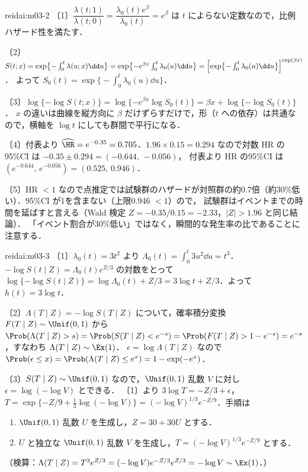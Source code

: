 \begin{kaitou}{reidai:m03-2}
〔1〕$\dfrac{\lambda(t;1)}{\lambda(t;0)}=\dfrac{\lambda_0(t)e^\beta}{\lambda_0(t)}=e^\beta$ は $t$ によらない定数なので，比例ハザード性を満たす．

〔2〕$S(t;x)=\exp\bigl\{-\int_0^t\lambda(u;x)\dd u\bigr\}=\exp\bigl\{-e^{\beta x}\int_0^t\lambda_0(u)\dd u\bigr\}=\Bigl[\exp\bigl\{-\int_0^t\lambda_0(u)\dd u\bigr\}\Bigr]^{\exp(\beta x)}$．
よって $S_0(t)=\exp\bigl\{-\int_0^t\lambda_0(u)\dd u\bigr\}$．

〔3〕$\log\{-\log S(t;x)\}=\log\{-e^{\beta x}\log S_0(t)\}=\beta x+\log\{-\log S_0(t)\}$．
$x$ の違いは曲線を縦方向に $\beta$ だけずらすだけで，形（$t$ への依存）は共通なので，横軸を $\log t$ にしても群間で平行になる．

〔4〕付表より $\widehat{\HR}=e^{-0.35}=0.705$．$1.96\times0.15=0.294$ なので対数 HR の95\%CI は $-0.35\pm0.294=(-0.644,\,-0.056)$，
付表より HR の95\%CI は $(e^{-0.644},\,e^{-0.056})=(0.525,\,0.946)$．

〔5〕HR $<1$ なので点推定では試験群のハザードが対照群の約0.7倍（約30\%低い）．95\%CI が1を含まない（上限0.946 $<1$）ので，
試験群はイベントまでの時間を延ばすと言える（Wald 検定 $Z=-0.35/0.15=-2.33$，$|Z|>1.96$ と同じ結論）．
「イベント割合が30\%低い」ではなく，瞬間的な発生率の比であることに注意する．
\end{kaitou}

\begin{kaitou}{reidai:m03-3}
〔1〕$\lambda_0(t)=3t^2$ より $\Lambda_0(t)=\int_0^t3u^2\dd u=t^3$．$-\log S(t\mid Z)=\Lambda_0(t)e^{Z/3}$ の対数をとって
$\log\{-\log S(t\mid Z)\}=\log\Lambda_0(t)+Z/3=3\log t+Z/3$．よって $h(t)=3\log t$．

〔2〕$\Lambda(T\mid Z)=-\log S(T\mid Z)$ について，確率積分変換 $F(T\mid Z)\sim\Unif(0,1)$ から
$\Prob(\Lambda(T\mid Z)>s)=\Prob(S(T\mid Z)<e^{-s})=\Prob(F(T\mid Z)>1-e^{-s})=e^{-s}$，すなわち $\Lambda(T\mid Z)\sim\Ex(1)$．
$\epsilon=\log\Lambda(T\mid Z)$ なので
$\Prob(\epsilon\le x)=\Prob(\Lambda(T\mid Z)\le e^x)=1-\exp(-e^x)$．

〔3〕$S(T\mid Z)\sim\Unif(0,1)$ なので，$\Unif(0,1)$ 乱数 $V$ に対し $\epsilon=\log(-\log V)$ とできる．
〔1〕より $3\log T=-Z/3+\epsilon$，$T=\exp\{-Z/9+\tfrac13\log(-\log V)\}=(-\log V)^{1/3}e^{-Z/9}$．手順は
\begin{enumerate}[label=Step \arabic*：,leftmargin=*]
\item $\Unif(0,1)$ 乱数 $U$ を生成し，$Z=30+30U$ とする．
\item $U$ と独立な $\Unif(0,1)$ 乱数 $V$ を生成し，$T=(-\log V)^{1/3}e^{-Z/9}$ とする．
\end{enumerate}
（検算：$\Lambda(T\mid Z)=T^3e^{Z/3}=(-\log V)e^{-Z/3}e^{Z/3}=-\log V\sim\Ex(1)$．）
\end{kaitou}

